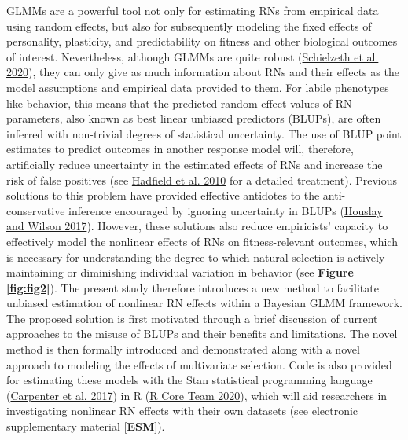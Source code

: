 \documentclass{article}
\begin{document}
GLMMs are a powerful tool not only for estimating RNs from empirical
data using random effects, but also for subsequently modeling the fixed
effects of personality, plasticity, and predictability on fitness and
other biological outcomes of interest. Nevertheless, although GLMMs are
quite robust (\protect\hyperlink{ref-Schiel2020}{Schielzeth et al.
2020}), they can only give as much information about RNs and their
effects as the model assumptions and empirical data provided to them.
For labile phenotypes like behavior, this means that the predicted
random effect values of RN parameters, also known as best linear
unbiased predictors (BLUPs), are often inferred with non-trivial degrees
of statistical uncertainty. The use of BLUP point estimates to predict
outcomes in another response model will, therefore, artificially reduce
uncertainty in the estimated effects of RNs and increase the risk of
false positives (see \protect\hyperlink{ref-Hadfield2010}{Hadfield et
al. 2010} for a detailed treatment). Previous solutions to this problem
have provided effective antidotes to the anti-conservative inference
encouraged by ignoring uncertainty in BLUPs
(\protect\hyperlink{ref-Hous2017}{Houslay and Wilson 2017}). However,
these solutions also reduce empiricists' capacity to effectively model
the nonlinear effects of RNs on fitness-relevant outcomes, which is
necessary for understanding the degree to which natural selection is
actively maintaining or diminishing individual variation in behavior
(see \textbf{Figure \ref{fig:fig2}}). The present study therefore
introduces a new method to facilitate unbiased estimation of nonlinear
RN effects within a Bayesian GLMM framework. The proposed solution is
first motivated through a brief discussion of current approaches to the
misuse of BLUPs and their benefits and limitations. The novel method is
then formally introduced and demonstrated along with a novel approach to
modeling the effects of multivariate selection. Code is also provided
for estimating these models with the Stan statistical programming
language (\protect\hyperlink{ref-Stan}{Carpenter et al. 2017}) in R
(\protect\hyperlink{ref-Rbase}{R Core Team 2020}), which will aid
researchers in investigating nonlinear RN effects with their own
datasets (see electronic supplementary material {[}\textbf{ESM}{]}).
\end{document}

